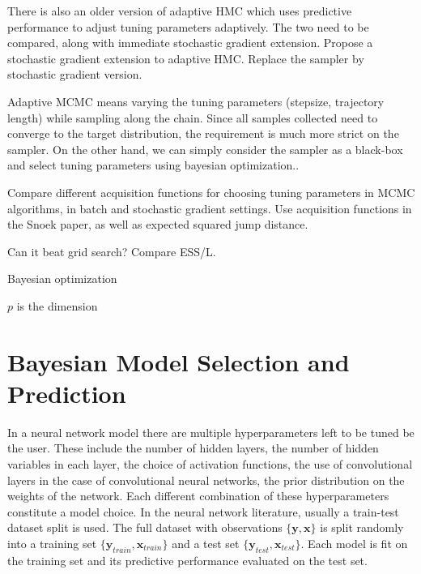 \documentclass{book}
\begin{document}
\begin{enumerate}
There is also an older version of adaptive HMC which uses predictive performance to adjust tuning parameters adaptively. The two need to be compared, along with immediate stochastic gradient extension. 
Propose a stochastic gradient extension to adaptive HMC. Replace the sampler by stochastic gradient version.  

Adaptive MCMC means varying the tuning parameters (stepsize, trajectory length)
while sampling along the chain. Since all samples collected need to converge to
the target distribution, the requirement is much more strict on the sampler.
On the other hand, we can simply consider the sampler as a black-box and select
tuning parameters using bayesian optimization.\cite{snoek2012practical}.

Compare different acquisition functions for choosing tuning parameters in MCMC
algorithms, in batch and stochastic gradient settings. 
Use acquisition functions in the Snoek paper, as well as expected squared jump
distance.

Can it beat grid search?
Compare ESS/L. 

\begin{algorithm}
    \caption{Bayesian optimization}
    \State
    \State $p$ is the dimension
\end{algorithm}
\section{Bayesian Model Selection and Prediction}
In a neural network model there are multiple hyperparameters left to be tuned be
the user. These include the number of hidden layers, the number of hidden
variables in each layer, the choice of activation functions, the use of
convolutional layers in the case of convolutional neural networks, the prior
distribution on the weights of the network. Each different combination of these
hyperparameters constitute a model choice. In the neural network literature,
usually a train-test dataset split is used. The full dataset with observations
$\{\textbf{y},\textbf{x}\}$ is split randomly into a training set
$\{\textbf{y}_{train}, \textbf{x}_{train}\}$ and a test set $\{\textbf{y}_{test},
\textbf{x}_{test} \}$. Each model is fit on the training set and its predictive
performance evaluated on the test set.


\end{enumerate}
\end{document}
